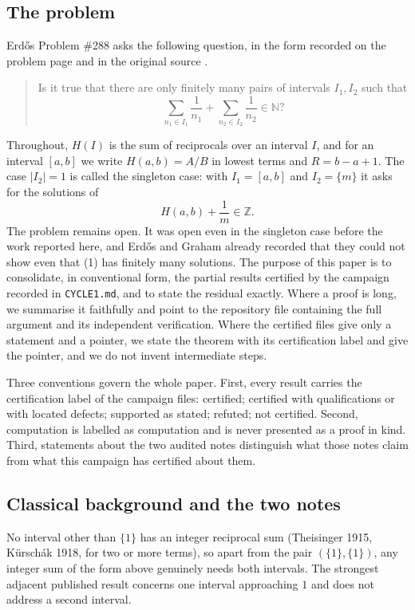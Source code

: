 \documentclass[11pt]{article}
\theoremstyle{remark}
\newcommand{\Hp}{H(a,b)}
\begin{document}
\subsection{The problem}

Erd\H{o}s Problem \#288 asks the following question, in the form recorded on the problem page \cite{bloom288} and in the original source \cite{ErGr80}.

\begin{quote}
Is it true that there are only finitely many pairs of intervals $I_1, I_2$ such that
\[
\sum_{n_1 \in I_1} \frac{1}{n_1} + \sum_{n_2 \in I_2} \frac{1}{n_2} \in \mathbb{N}?
\]
\end{quote}

Throughout, $H(I)$ is the sum of reciprocals over an interval $I$, and for an interval $[a,b]$ we write $\Hp = A/B$ in lowest terms and $R = b - a + 1$. The case $|I_2| = 1$ is called the singleton case: with $I_1 = [a,b]$ and $I_2 = \{m\}$ it asks for the solutions of
\[
\Hp + \frac{1}{m} \in \mathbb{Z}. \tag{1}
\]
The problem remains open. It was open even in the singleton case before the work reported here, and Erd\H{o}s and Graham already recorded that they could not show even that (1) has finitely many solutions. The purpose of this paper is to consolidate, in conventional form, the partial results certified by the campaign recorded in \texttt{CYCLE1.md}, and to state the residual exactly. Where a proof is long, we summarise it faithfully and point to the repository file containing the full argument and its independent verification. Where the certified files give only a statement and a pointer, we state the theorem with its certification label and give the pointer, and we do not invent intermediate steps.

Three conventions govern the whole paper. First, every result carries the certification label of the campaign files: certified; certified with qualifications or with located defects; supported as stated; refuted; not certified. Second, computation is labelled as computation and is never presented as a proof in kind. Third, statements about the two audited notes distinguish what those notes claim from what this campaign has certified about them.

\subsection{Classical background and the two notes}

No interval other than $\{1\}$ has an integer reciprocal sum (Theisinger 1915, K\"ursch\'ak 1918, for two or more terms), so apart from the pair $(\{1\}, \{1\})$, any integer sum of the form above genuinely needs both intervals. The strongest adjacent published result concerns one interval approaching $1$ and does not address a second interval.
\end{document}
